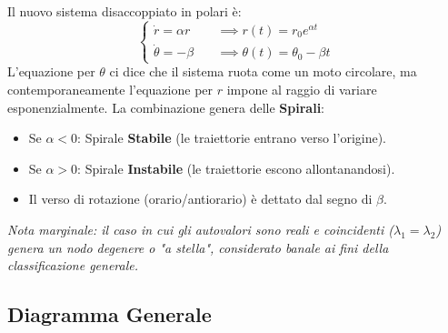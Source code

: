 \documentclass[openany]{book}
\theoremstyle{definition}
\theoremstyle{remark}
\begin{document}
Il nuovo sistema disaccoppiato in polari è:
\begin{equation}
    \begin{cases}
        \dot{r} = \alpha r \quad &\implies r(t) = r_0 e^{\alpha t} \\
        \dot{\theta} = -\beta \quad &\implies \theta(t) = \theta_0 - \beta t
    \end{cases}
\end{equation}
L'equazione per $\theta$ ci dice che il sistema ruota come un moto circolare, ma contemporaneamente l'equazione per $r$ impone al raggio di variare esponenzialmente. La combinazione genera delle \textbf{Spirali}:
\begin{itemize}
    \item Se $\alpha < 0$: Spirale \textbf{Stabile} (le traiettorie entrano verso l'origine).
    \item Se $\alpha > 0$: Spirale \textbf{Instabile} (le traiettorie escono allontanandosi).
    \item Il verso di rotazione (orario/antiorario) è dettato dal segno di $\beta$.
\end{itemize}

\begin{center}
\end{center}

\textit{Nota marginale: il caso in cui gli autovalori sono reali e coincidenti ($\lambda_1 = \lambda_2$) genera un nodo degenere o "a stella", considerato banale ai fini della classificazione generale.}

\subsection{Diagramma Generale}
\end{document}
